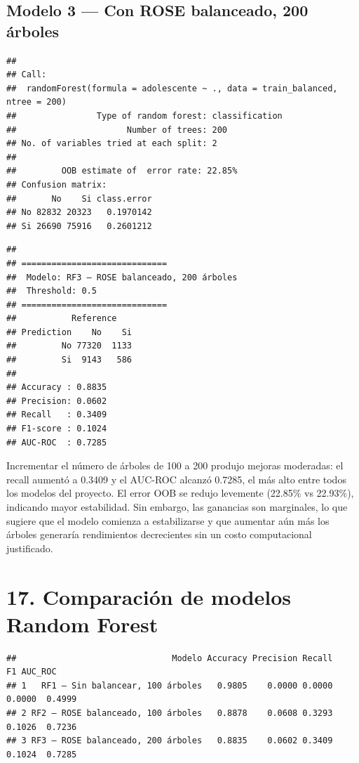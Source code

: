 \documentclass[
]{article}
\begin{document}
\subsection{Modelo 3 --- Con ROSE balanceado, 200
árboles}\label{modelo-3-con-rose-balanceado-200-uxe1rboles}

\begin{verbatim}
## 
## Call:
##  randomForest(formula = adolescente ~ ., data = train_balanced,      ntree = 200) 
##                Type of random forest: classification
##                      Number of trees: 200
## No. of variables tried at each split: 2
## 
##         OOB estimate of  error rate: 22.85%
## Confusion matrix:
##       No    Si class.error
## No 82832 20323   0.1970142
## Si 26690 75916   0.2601212
\end{verbatim}

\begin{verbatim}
## 
## =============================
##  Modelo: RF3 – ROSE balanceado, 200 árboles 
##  Threshold: 0.5 
## =============================
##           Reference
## Prediction    No    Si
##         No 77320  1133
##         Si  9143   586
## 
## Accuracy : 0.8835 
## Precision: 0.0602 
## Recall   : 0.3409 
## F1-score : 0.1024 
## AUC-ROC  : 0.7285
\end{verbatim}

Incrementar el número de árboles de 100 a 200 produjo mejoras moderadas:
el recall aumentó a 0.3409 y el AUC-ROC alcanzó 0.7285, el más alto
entre todos los modelos del proyecto. El error OOB se redujo levemente
(22.85\% vs 22.93\%), indicando mayor estabilidad. Sin embargo, las
ganancias son marginales, lo que sugiere que el modelo comienza a
estabilizarse y que aumentar aún más los árboles generaría rendimientos
decrecientes sin un costo computacional justificado.

\section{17. Comparación de modelos Random
Forest}\label{comparaciuxf3n-de-modelos-random-forest}

\begin{verbatim}
##                               Modelo Accuracy Precision Recall     F1 AUC_ROC
## 1   RF1 – Sin balancear, 100 árboles   0.9805    0.0000 0.0000 0.0000  0.4999
## 2 RF2 – ROSE balanceado, 100 árboles   0.8878    0.0608 0.3293 0.1026  0.7236
## 3 RF3 – ROSE balanceado, 200 árboles   0.8835    0.0602 0.3409 0.1024  0.7285
\end{verbatim}
\end{document}
